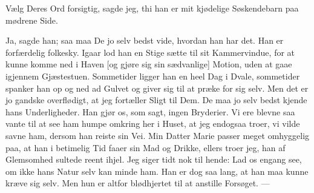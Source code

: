 \documentclass[12pt]{article}
\newcommand{\apage}[1]{\marginnote{\footnotesize\textit{[#1]}}}
\begin{document}
Vælg Deres Ord forsigtig, sagde jeg, thi han er mit kjødelige
Søskendebarn paa mødrene Side.

Ja, sagde han; saa maa De jo selv bedst vide, hvordan han har
det. Han er forfærdelig folkesky. Igaar lod han en Stige sætte til
sit Kammervindue, for at kunne komme ned i Haven [og gjøre sig sin
sædvanlige] Motion, uden at gaae igjennem Gjæstestuen. Sommetider
ligger han en heel Dag i Dvale, sommetider spanker han op og ned ad
Gulvet og giver sig til at præke for sig selv. Men det er jo gandske
overflødigt, at jeg fortæller Sligt til Dem. De maa jo selv bedst
kjende hans Underligheder. Han gjør os, som sagt, ingen Bryderier. Vi
ere blevne saa vante til at see ham humpe omkring her i Huset, at jeg
endogsaa troer, vi vilde savne ham, dersom han reiste sin Vei. Min
Datter Marie passer meget omhyggelig paa, at han i betimelig Tid faaer
sin Mad og Drikke, ellers troer jeg, han af Glemsomhed sultede reent
ihjel. Jeg siger tidt nok til hende: Lad os engang see, om ikke hans
Natur selv kan minde ham. \apage{90}Han er dog saa lang, at han maa kunne kræve
sig selv. Men hun er altfor blødhjertet til at anstille Forsøget. ---
\end{document}
